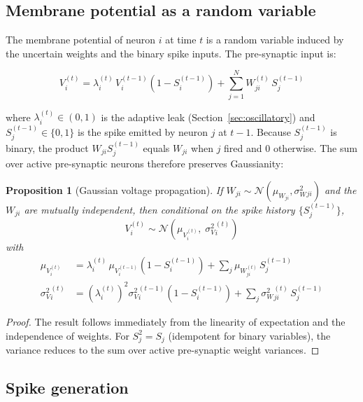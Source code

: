 \documentclass[12pt, a4paper]{article}
\newtheorem{proposition}{Proposition}[section]
\newcommand{\Normal}{\mathcal{N}}
\newcommand{\mW}{\mu_{W}}
\newcommand{\sW}{\sigma^{2}_{W}}
\newcommand{\mV}{\mu_{V}}
\newcommand{\sV}{\sigma^{2}_{V}}
\begin{document}
\subsection{Membrane potential as a random variable}

The membrane potential of neuron $i$ at time $t$ is a random variable induced by the
uncertain weights and the binary spike inputs. The pre-synaptic input is:

\begin{equation}
    V_i^{(t)} = \lambda_i^{(t)}\, V_i^{(t-1)}\left(1 - S_i^{(t-1)}\right)
    + \sum_{j=1}^{N} W_{ji}^{(t)}\, S_j^{(t-1)}
    \label{eq:voltage}
\end{equation}

where $\lambda_i^{(t)} \in (0,1)$ is the adaptive leak (Section~\ref{sec:oscillatory})
and $S_j^{(t-1)} \in \{0,1\}$ is the spike emitted by neuron $j$ at $t-1$. Because
$S_j^{(t-1)}$ is binary, the product $W_{ji} S_j^{(t-1)}$ equals $W_{ji}$ when $j$
fired and $0$ otherwise. The sum over active pre-synaptic neurons therefore preserves
Gaussianity:

\begin{proposition}[Gaussian voltage propagation]
If $W_{ji} \sim \Normal(\mW_{ji}, \sW_{ji})$ and the $W_{ji}$ are mutually independent,
then conditional on the spike history $\{S_j^{(t-1)}\}$,
\begin{equation}
    V_i^{(t)} \sim \Normal\!\left(\mV_i^{(t)},\; \sV_i^{(t)}\right)
    \label{eq:volt_dist}
\end{equation}
with
\begin{align}
    \mV_i^{(t)} &= \lambda_i^{(t)}\, \mV_i^{(t-1)}\!\left(1-S_i^{(t-1)}\right)
        + \sum_{j} \mW_{ji}^{(t)}\, S_j^{(t-1)} \label{eq:mu_v} \\[4pt]
    \sV_i^{(t)} &= \left(\lambda_i^{(t)}\right)^2\!\sV_i^{(t-1)}\!\left(1-S_i^{(t-1)}\right)
        + \sum_{j} \sW_{ji}^{(t)}\, S_j^{(t-1)} \label{eq:sig_v}
\end{align}
\end{proposition}

\begin{proof}
The result follows immediately from the linearity of expectation and the independence of
weights. For $S_j^2 = S_j$ (idempotent for binary variables), the variance reduces to
the sum over active pre-synaptic weight variances.
\end{proof}

\subsection{Spike generation}
\end{document}
